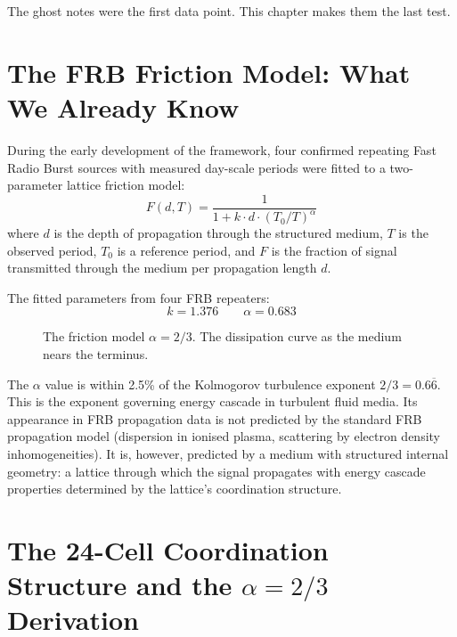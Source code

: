 \documentclass[11pt, letterpaper, openany]{book}
\begin{document}
The ghost notes were the first data point. This chapter makes them the last test.

\section{The FRB Friction Model: What We Already Know}

During the early development of the framework, four confirmed repeating Fast
Radio Burst sources with measured day-scale periods were fitted to a two-parameter
lattice friction model:
\[
F(d, T) = \frac{1}{1 + k \cdot d \cdot (T_0/T)^\alpha}
\]
where $d$ is the depth of propagation through the structured medium, $T$ is
the observed period, $T_0$ is a reference period, and $F$ is the fraction of
signal transmitted through the medium per propagation length $d$.

The fitted parameters from four FRB repeaters:
\[
k = 1.376 \qquad \alpha = 0.683
\]

\begin{figure}[H]
\caption{The friction model $\alpha = 2/3$. The dissipation curve as the medium nears the terminus.}
\end{figure}

The $\alpha$ value is within 2.5\% of the Kolmogorov turbulence exponent
$2/3 = 0.6\overline{6}$. This is the exponent governing energy cascade
in turbulent fluid media. Its appearance in FRB propagation data is not
predicted by the standard FRB propagation model (dispersion in ionised
plasma, scattering by electron density inhomogeneities). It is, however,
predicted by a medium with structured internal geometry: a lattice through
which the signal propagates with energy cascade properties determined by
the lattice's coordination structure.

\section{The 24-Cell Coordination Structure and the $\alpha = 2/3$ Derivation}
\end{document}

